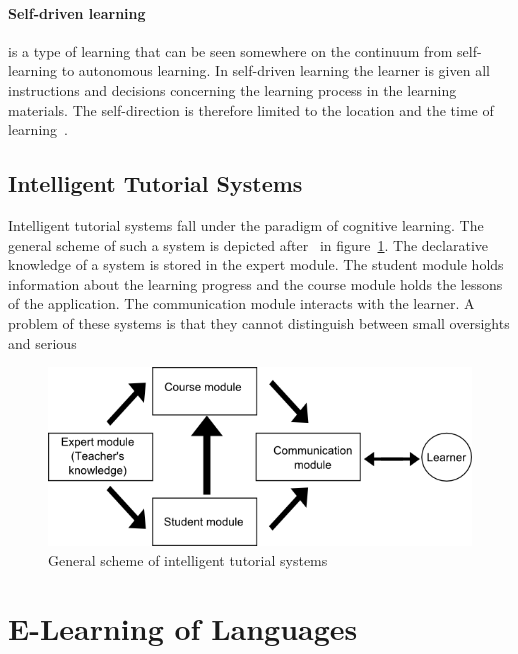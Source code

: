 \paragraph{Self-driven learning} is a type of learning that can be seen somewhere
on the continuum from self-learning to autonomous learning. In self-driven 
learning the learner is given all instructions and decisions concerning the
learning process in the learning materials. The self-direction is therefore 
limited to the location and the time of learning~.

\subsection{Intelligent Tutorial Systems}
\label{sec:elearn:intelligenttutorialsystems}

Intelligent tutorial systems fall under the paradigm of cognitive learning.
The general scheme of such a system is depicted after~ in 
figure~\ref{fig:tutorialsystems}. 
The declarative knowledge of a system is stored in the expert module. 
The student module holds information about the learning progress and the
course module holds the lessons of the application.
The communication module interacts with the learner.
A problem of these systems is that they cannot distinguish between
small oversights and serious 

\begin{figure}[htbp]
\begin{center}
\includegraphics[scale=0.5]{images/E-Learning/tutorialSystems.png}
\caption{General scheme of intelligent tutorial systems}
\label{fig:tutorialsystems}
\end{center}
\end{figure}

\section{E-Learning of Languages}
\label{sec:elearn:elearningoflanguages}

